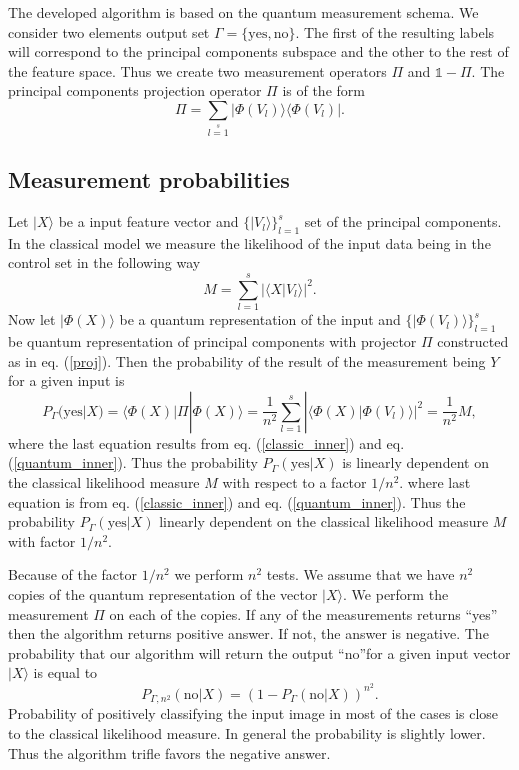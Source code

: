 \documentclass[a4paper,10pt]{llncs}
\newcommand{\ket}[1]{| #1 \rangle}
\newcommand{\bra}[1]{\langle #1 |}
\newcommand{\ketbra}[2]{| #1 \rangle \langle #2 |}
\newcommand{\braket}[2]{\bra{#2}{#1}\rangle}
\newcommand{\1}{\mathbb{1}}
\begin{document}
The developed algorithm is based on the quantum measurement schema. 
We consider two elements output set $\Gamma=\{\mathrm{yes}, \mathrm{no}\}$. The first of the resulting 
labels will correspond to the principal components subspace and the other to 
the rest of the feature space. Thus we create two measurement operators $\Pi$ 
and $\mathbb{1}-\Pi$.
The principal components projection operator $\Pi$ is of the form
\begin{equation}
\Pi=\sum\limits_{l=1}\limits^s\ketbra{\Phi(V_l)}{\Phi(V_l)}. \label{proj}
\end{equation}


\subsection{Measurement probabilities}
Let $\ket{X}$ be a input feature vector and $\{\ket{V_l}\}_{l=1}^s$ set of the 
principal components.
In the classical model we measure the likelihood of the input data being in the 
control set in the following way
\begin{equation}
M=\sum_{l=1}^{s}|\braket{V_l}{X}|^2.
\end{equation}
Now let $\ket{\Phi(X)}$ be a quantum representation of the input and 
$\{\ket{\Phi(V_l)}\}_{l=1}^s$ be quantum representation of principal components 
with projector $\Pi$ constructed as in eq. (\ref{proj}). Then the probability
of the result of the measurement being $Y$ for a given input is
\begin{equation}
P_{\Gamma }(\mathrm{yes}|X)=\bra{\Phi(X)}\Pi\ket{\Phi(X)}=\frac{1}{n^2}\sum\limits_{l=1}^{s}|\braket{\Phi(V_l)}{\Phi(X)}|^2=\frac{1}{n^2}M,
\end{equation}
where the last equation results from eq. (\ref{classic_inner}) and eq.
(\ref{quantum_inner}). Thus the probability $P_{\Gamma }(\mathrm{yes}|X)$ is linearly dependent on 
the classical likelihood measure $M$ with respect to a factor $1/n^2$.
where last equation is from eq. (\ref{classic_inner}) and eq.
(\ref{quantum_inner}). Thus the probability $P_{\Gamma }(\mathrm{yes}|X)$ linearly dependent on 
the classical likelihood measure $M$ with factor $1/n^2$.

Because of the factor $1/n^2$ we perform $n^2$ tests.
We assume that we have $n^2$ copies of the quantum representation of the vector 
$\ket{X}$. We perform the measurement $\Pi$ on each of the copies.
If any of the measurements returns ``yes'' then the algorithm returns positive 
answer. If not, the answer is negative.
The probability that our algorithm will return the output ``no''for a given 
input vector $\ket{X}$ is equal to
\begin{equation}
P_{\Gamma, n^2}(\mathrm{no}|X)=(1-P_{\Gamma }(\mathrm{no}|X))^{n^2}.
\end{equation} 
Probability of positively classifying the input image in most of the cases is close to the classical likelihood measure. In general the probability is slightly lower. Thus the algorithm trifle favors the negative answer.
\end{document}
